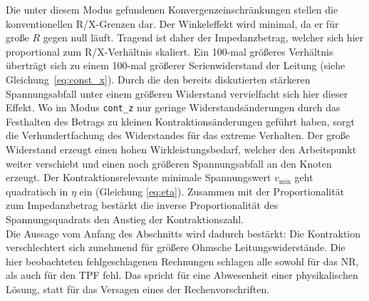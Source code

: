 Die unter diesem Modus gefundenen Konvergenzeinschränkungen stellen die konventionellen R/X-Grenzen dar.
Der Winkeleffekt wird minimal, da er für große $R$ gegen null läuft. 
Tragend ist daher der Impedanzbetrag, welcher sich hier proportional zum R/X-Verhältnis skaliert.
Ein 100-mal größeres Verhältnis überträgt sich zu einem 100-mal größerer Serienwiderstand der Leitung (siehe Gleichung~\eqref{eq:const_x}).
Durch die den bereits diskutierten stärkeren Spannungsabfall unter einem größeren Widerstand vervielfacht sich hier dieser Effekt.
Wo im Modus \texttt{cont\_z} nur geringe Widerstandsänderungen durch das Festhalten des Betrags zu kleinen Kontraktionsänderungen geführt haben, sorgt die Verhundertfachung des Widerstandes für das extreme Verhalten.
Der große Widerstand erzeugt einen hohen Wirkleistungsbedarf, welcher den Arbeitspunkt weiter verschiebt und einen noch größeren Spannungsabfall an den Knoten erzeugt.
Der Kontraktionsrelevante minimale Spannungswert $v_\mathrm{min}$ geht quadratisch in $\eta$ ein (Gleichung \eqref{eq:eta}).
Zusammen mit der Proportionalität zum Impedanzbetrag bestärkt die inverse Proportionalität des Spannungsquadrats den Anstieg der Kontraktionszahl. \\

Die Aussage vom Anfang des Abschnitts wird dadurch bestärkt: Die Kontraktion verschlechtert sich zunehmend für größere Ohmsche Leitungswiderstände.
Die hier beobachteten fehlgeschlagenen Rechnungen schlagen alle sowohl für das NR, als auch für den TPF fehl.
Das spricht für eine Abwesenheit einer physikalischen Lösung, statt für das Versagen eines der Rechenvorschriften.






